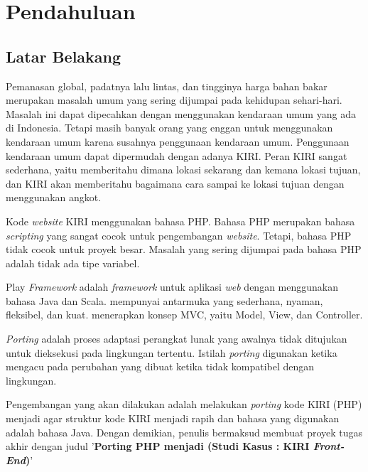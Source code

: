 \chapter{Pendahuluan}
\label{chap:pendahuluan}

\section{Latar Belakang}
\label{sec:latarbelakang}

Pemanasan global, padatnya lalu lintas, dan tingginya harga bahan bakar merupakan masalah umum yang sering dijumpai pada kehidupan sehari-hari. Masalah ini dapat dipecahkan dengan menggunakan kendaraan umum yang ada di Indonesia. Tetapi masih banyak orang yang enggan untuk menggunakan kendaraan umum karena susahnya penggunaan kendaraan umum. Penggunaan kendaraan umum dapat dipermudah dengan adanya KIRI. Peran KIRI sangat sederhana, yaitu memberitahu dimana lokasi sekarang dan kemana lokasi tujuan, dan KIRI akan memberitahu bagaimana cara sampai ke lokasi tujuan dengan menggunakan angkot\cite{statickiri}. 

Kode \textit{website} KIRI menggunakan bahasa PHP. Bahasa PHP merupakan bahasa \textit{scripting} yang sangat cocok untuk pengembangan \textit{website}. Tetapi, bahasa PHP tidak cocok untuk proyek besar. Masalah yang sering dijumpai pada bahasa PHP adalah tidak ada tipe variabel\cite{phpnet}. 

Play \textit{Framework} adalah \textit{framework} untuk aplikasi \textit{web} dengan menggunakan bahasa Java dan Scala. \play mempunyai antarmuka yang sederhana, nyaman, fleksibel, dan kuat. \play menerapkan konsep MVC, yaitu Model, View, dan Controller\cite{playforjava}. 

\textit{Porting} adalah proses adaptasi perangkat lunak yang awalnya tidak ditujukan untuk dieksekusi pada lingkungan tertentu. Istilah \textit{porting} digunakan ketika mengacu pada perubahan yang dibuat ketika tidak kompatibel dengan lingkungan\cite{porting}.

Pengembangan yang akan dilakukan adalah melakukan \textit{porting} kode KIRI (PHP) menjadi \play agar struktur kode KIRI menjadi rapih dan bahasa yang digunakan adalah bahasa Java. Dengan demikian, penulis bermaksud membuat proyek tugas akhir dengan judul '\textbf{Porting PHP menjadi \play (Studi Kasus : KIRI \textit{Front-End})}'

